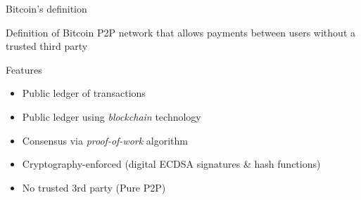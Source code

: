 \documentclass{beamer}
\begin{document}
\begin{frame}{Bitcoin's definition}
 \begin{block}{Definition of Bitcoin}
  P2P network that allows payments between users without a trusted third
  party
 \end{block}

 \begin{block}{Features}
  \begin{itemize}
   \item Public ledger of transactions
   \item Public ledger using \textit{blockchain} technology
   \item Consensus via \textit{proof-of-work} algorithm
   \item Cryptography-enforced (digital ECDSA signatures \& hash functions)
   \item No trusted 3rd party (Pure P2P)
  \end{itemize}
 \end{block}
\end{frame}
\end{document}
